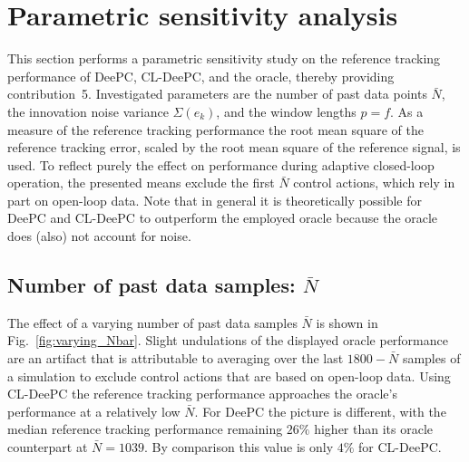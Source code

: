 \section{Parametric sensitivity analysis}\label{sec:sensitivity_study}
\noindent This section performs a parametric sensitivity study on the reference tracking performance of \ac{DeePC}, \ac{CL-DeePC}, and the oracle, thereby providing contribution~5. Investigated parameters are the number of past data points $\bar{N}$, the innovation noise variance $\Sigma(e_k)$, and the window lengths $p=f$. As a measure of the reference tracking performance the root mean square of the reference tracking error, scaled by the root mean square of the reference signal, is used. To reflect purely the effect on performance during adaptive closed-loop operation, the presented means exclude the first $\bar{N}$ control actions, which rely in part on open-loop data. Note that in general it is theoretically possible for \ac{DeePC} and \ac{CL-DeePC} to outperform the employed oracle because the oracle does (also) not account for noise.

\subsection{Number of past data samples: $\bar{N}$}
\noindent The effect of a varying number of past data samples $\bar{N}$ is shown in Fig.~\ref{fig:varying_Nbar}. Slight undulations of the displayed oracle performance are an artifact that is attributable to averaging over the last $1800-\bar{N}$ samples of a simulation to exclude control actions that are based on open-loop data. Using \ac{CL-DeePC} the reference tracking performance approaches the oracle's performance at a relatively low $\bar{N}$. For \ac{DeePC} the picture is different, with the median reference tracking performance remaining $26\%$ higher than its oracle counterpart at $\bar{N}=1039$. By comparison this value is only $4\%$ for \ac{CL-DeePC}.

